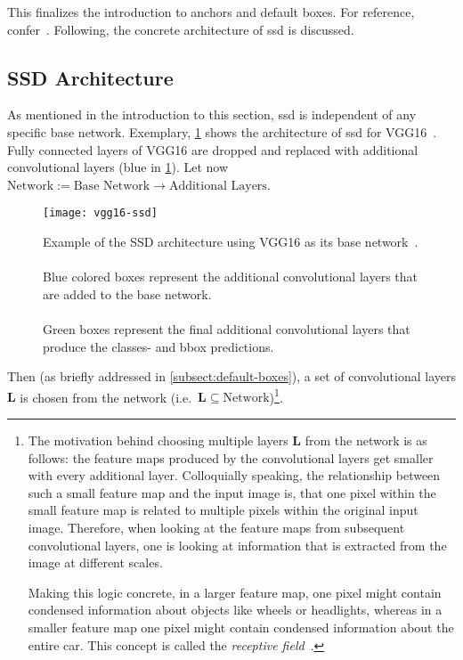 This finalizes the introduction to anchors and default boxes. For reference,
confer~\cite{Liu.2016}. Following, the concrete architecture of \gls{ssd} is discussed.

\subsection{SSD Architecture}\label{subsect:SSD Architecture}
As mentioned in the introduction to this section, \gls{ssd} is independent of any
specific base network. Exemplary, \cref{fig:ssd-vgg} shows the architecture of
\gls{ssd} for VGG16~\cite{Simonyan.2015}. Fully connected \glspl{layer} of VGG16
are dropped and replaced with additional \glspl{convolutional layer} (blue in \cref{fig:ssd-vgg}).
Let now \(\text{Network}:=\text{Base Network}\rightarrow \text{Additional Layers}\).
\begin{figure}[th!]
    \centering
    \texttt{[image: vgg16-ssd]}
    \caption[Example of the SSD architecture using VGG16 as its base network]{Example
    of the SSD architecture using VGG16 as its base network~\cite[cf.][]{Liu.2016}.
    \\\\
    Blue colored boxes represent the additional \glspl{convolutional layer} that are added to the base network.
    \\\\
    Green boxes represent the final additional \glspl{convolutional layer} that produce
    the classes- and \gls{bbox} predictions.}
    \label{fig:ssd-vgg}
\end{figure}
Then (as briefly addressed in \cref{subsect:default-boxes}), a set of
\glspl{convolutional layer} \(\mathbf{L}\) is chosen from the network (i.e.\
\(\mathbf{L}\subseteq \text{Network}\))\footnote{\label{foot:receptive}The motivation
behind choosing multiple layers \(\mathbf{L}\) from the network is as follows:
the \glspl{feature map} produced by the \glspl{convolutional layer} get smaller
with every additional layer. Colloquially speaking, the relationship between such
a small \gls{feature map} and the input image is, that one pixel within the small
\gls{feature map} is related to multiple pixels within the original input image.
Therefore, when looking at the \glspl{feature map} from subsequent
\glspl{convolutional layer}, one is looking at information that is extracted from
the image at different scales.

Making this logic concrete, in a larger \gls{feature map}, one pixel might contain
condensed information about objects like wheels or headlights, whereas in a smaller
\gls{feature map} one pixel might contain  condensed information about the entire
car. This concept is called the \textit{receptive field}~\cite[cf.][331\psq]{Goodfellow.2016}.}.

